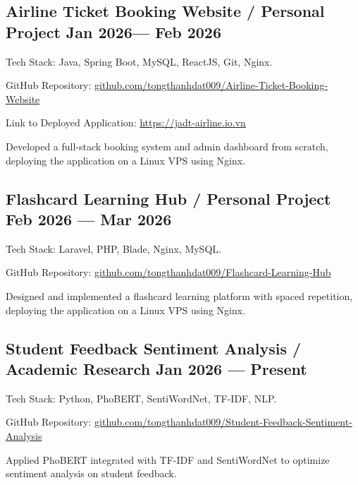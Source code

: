 

\subsection{\texorpdfstring{Airline Ticket Booking Website / Personal Project \hfill Jan 2026--- Feb 2026}{ROLE / PROJECT A - MMM YYYY --- Present}}
\begin{zitemize}
    \item Tech Stack: Java, Spring Boot, MySQL, ReactJS, Git, Nginx.
    \item GitHub Repository: \href{https://github.com/tongthanhdat009/Airline-Ticket-Booking-Website}{github.com/tongthanhdat009/Airline-Ticket-Booking-Website}
    \item Link to Deployed Application: \href{https://jadt-airline.io.vn}{https://jadt-airline.io.vn}
    \item Developed a full-stack booking system and admin dashboard from scratch, deploying the application on a Linux VPS using Nginx.
\end{zitemize}

\subsection{\texorpdfstring{Flashcard Learning Hub / Personal Project \hfill Feb 2026 --- Mar 2026}{ROLE / PROJECT I - MMM YYYY --- MMM YYYY}}
\begin{zitemize}
    \item Tech Stack: Laravel, PHP, Blade, Nginx, MySQL. 
    \item GitHub Repository: \href{https://github.com/tongthanhdat009/Flashcard-Learning-Hub}{github.com/tongthanhdat009/Flashcard-Learning-Hub}
    \item Designed and implemented a flashcard learning platform with spaced repetition, deploying the application on a Linux VPS using Nginx.
\end{zitemize}
\subsection{\texorpdfstring{Student Feedback Sentiment Analysis / Academic Research \hfill Jan 2026 --- Present}{ROLE / PROJECT F - MMM YYYY --- MMM YYYY}}
\begin{zitemize}
   \item Tech Stack: Python, PhoBERT, SentiWordNet, TF-IDF, NLP. 
   \item GitHub Repository: \href{https://github.com/tongthanhdat009/Student-Feedback-Sentiment-Analysis}{github.com/tongthanhdat009/Student-Feedback-Sentiment-Analysis}
   \item Applied PhoBERT integrated with TF-IDF and SentiWordNet to optimize sentiment analysis on student feedback.
\end{zitemize}
